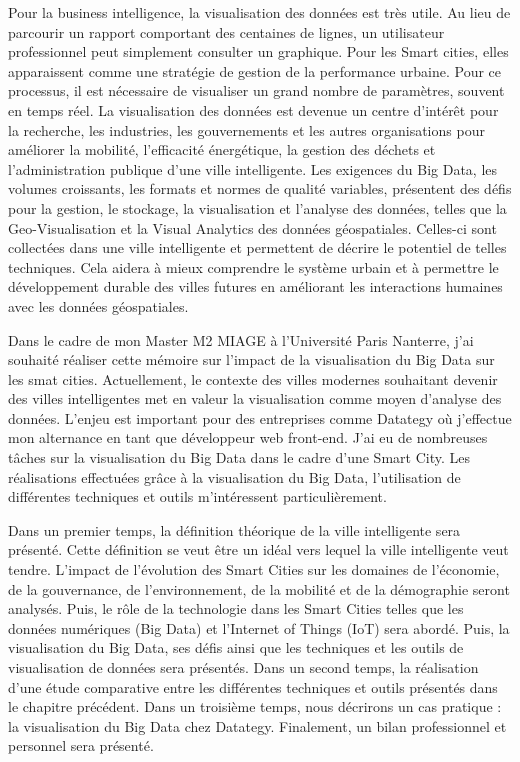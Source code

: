\documentclass[french, a4paper, 12pt]{report}
\begin{document}
Pour la business intelligence, la visualisation des données est très utile. Au lieu de parcourir un rapport comportant des centaines de lignes, un utilisateur professionnel peut simplement consulter un graphique.
Pour les Smart cities, elles apparaissent comme une stratégie de gestion de la performance urbaine. Pour ce processus, il est nécessaire de visualiser un grand nombre de paramètres, souvent en temps réel. 
La visualisation des données est devenue un centre d'intérêt pour la recherche, les industries, les gouvernements et les autres organisations pour améliorer la mobilité, l'efficacité énergétique, la gestion des déchets et l'administration publique d'une ville intelligente. Les exigences du Big Data, les volumes croissants, les formats et normes de qualité variables, présentent des défis pour la gestion, le stockage, la visualisation et l'analyse des données, telles que la Geo-Visualisation et la Visual Analytics des données géospatiales. Celles-ci sont collectées dans une ville intelligente et permettent de décrire le potentiel de telles techniques. Cela aidera à mieux comprendre le système urbain et à permettre le développement durable des villes futures en améliorant les interactions humaines avec les données géospatiales.

Dans le cadre de mon Master M2 MIAGE à l’Université Paris Nanterre, j’ai souhaité réaliser cette mémoire sur l'impact de la visualisation du Big Data sur les smat cities. 
Actuellement, le contexte des villes modernes souhaitant devenir des villes intelligentes met en valeur la visualisation comme moyen d’analyse des données. L’enjeu est important pour des entreprises comme Datategy où j’effectue mon alternance en tant que développeur web front-end. J’ai eu de nombreuses tâches sur la visualisation du Big Data dans le cadre d’une Smart City. Les réalisations effectuées grâce à la visualisation du Big Data, l’utilisation de différentes techniques  et outils m’intéressent particulièrement. 

Dans un premier temps, la définition théorique de la ville intelligente sera présenté. Cette définition se veut être un idéal vers lequel la ville intelligente veut tendre. L’impact de l'évolution des Smart Cities sur les domaines de l’économie, de la gouvernance, de l’environnement, de la mobilité et de la démographie seront analysés. Puis, le rôle de la technologie dans les Smart Cities telles que les données numériques (Big Data) et l’Internet of Things (IoT) sera abordé. Puis, la visualisation du Big Data, ses défis ainsi que les techniques et les outils de visualisation de données sera présentés. 
Dans un second temps, la réalisation d’une étude comparative entre les différentes techniques et outils présentés dans le chapitre précédent. 
Dans un troisième temps, nous décrirons un cas pratique :  la visualisation du Big Data chez Datategy. 
Finalement, un bilan professionnel et personnel sera présenté. 
\end{document}
